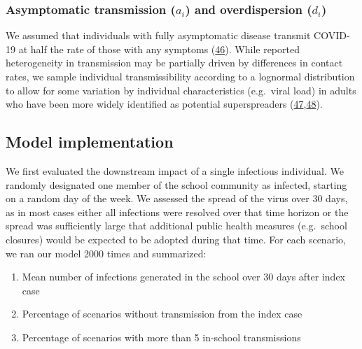 \documentclass[
]{article}
\providecommand{\tightlist}{%
  \setlength{\itemsep}{0pt}\setlength{\parskip}{0pt}}
\begin{document}
\medskip

\hypertarget{asymptomatic-transmission-a_i-and-overdispersion-d_i}{%
\subsubsection{\texorpdfstring{Asymptomatic transmission (\(a_i\)) and
overdispersion
(\(d_i\))}{Asymptomatic transmission (a\_i) and overdispersion (d\_i)}}\label{asymptomatic-transmission-a_i-and-overdispersion-d_i}}

We assumed that individuals with fully asymptomatic disease transmit
COVID-19 at half the rate of those with any symptoms
(\protect\hyperlink{ref-byambasuren_estimating_2020}{46}). While
reported heterogeneity in transmission may be partially driven by
differences in contact rates, we sample individual transmissibility
according to a lognormal distribution to allow for some variation by
individual characteristics (e.g.~viral load) in adults who have been
more widely identified as potential superspreaders
(\protect\hyperlink{ref-kerr_covasim_2020}{47},\protect\hyperlink{ref-endo_estimating_2020}{48}).

\hypertarget{model-implementation}{%
\subsection{Model implementation}\label{model-implementation}}

We first evaluated the downstream impact of a single infectious
individual. We randomly designated one member of the school community as
infected, starting on a random day of the week. We assessed the spread
of the virus over 30 days, as in most cases either all infections were
resolved over that time horizon or the spread was sufficiently large
that additional public health measures (e.g.~school closures) would be
expected to be adopted during that time. For each scenario, we ran our
model 2000 times and summarized:

\begin{enumerate}
\def\labelenumi{\arabic{enumi}.}
\tightlist
\item
  Mean number of infections generated in the school over 30 days after
  index case
\item
  Percentage of scenarios without transmission from the index case
\item
  Percentage of scenarios with more than 5 in-school transmissions
\end{enumerate}
\end{document}
